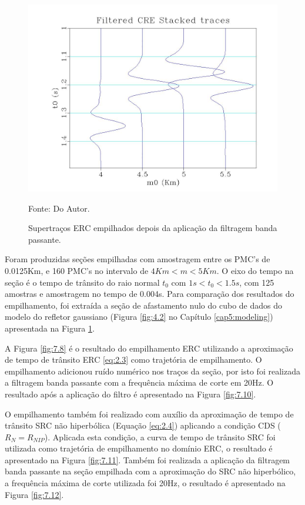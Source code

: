 \begin{figure}
\caption{Supertraços ERC empilhados depois da aplicação da filtragem banda passante.}
\begin{center}
\includegraphics[scale=0.4]{images/filtStackedTraces.jpeg}
\vspace{-0.3cm}
\end{center}
\begin{center}
 Fonte: Do Autor.
\end{center}
\label{fig:7.7}
\end{figure}


Foram produzidas seções empilhadas com 
amostragem entre os PMC's de 0.0125Km, e 160 PMC's no intervalo de $4Km<m<5Km$. O eixo do tempo na 
seção é o tempo de trânsito do raio normal $t_0$ com $1s<t_0<1.5s$, com 125 amostras e amostragem no tempo de 0.004s.
Para comparação dos resultados do empilhamento, foi extraída a seção de afastamento nulo do cubo de dados do modelo do
refletor gaussiano (Figura \ref{fig:4.2} no Capítulo \ref{cap5:modeling}) apresentada na Figura \ref{fig:7.7}.

A Figura \ref{fig:7.8} é o resultado do empilhamento ERC utilizando a aproximação de tempo de trânsito ERC \ref{eq:2.3}
como trajetória de empilhamento. O empilhamento adicionou ruído numérico nos traços da seção, por isto foi realizada a filtragem
banda passante com a frequência máxima de corte em 20Hz. O resultado após a aplicação do filtro é apresentado na Figura
\ref{fig:7.10}.

O empilhamento também foi realizado com auxílio da aproximação de tempo de trânsito SRC não hiperbólica
(Equação \ref{eq:2.4}) aplicando a condição CDS
($R_N=R_{NIP}$). Aplicada esta condição, a curva de tempo de trânsito SRC foi utilizada como trajetória de empilhamento no domínio
ERC, o resultado é apresentado na Figura \ref{fig:7.11}. Também foi realizada a aplicação da filtragem banda passante na seção
empilhada com a aproximação do SRC não hiperbólico, a frequência máxima de corte utilizada foi 20Hz, o resultado é apresentado
na Figura \ref{fig:7.12}.

